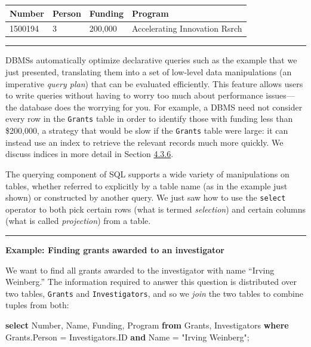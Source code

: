 \documentclass[]{krantz}
\newenvironment{Shaded}{\begin{snugshade}}{\end{snugshade}}
\newcommand{\KeywordTok}[1]{\textcolor[rgb]{0.13,0.29,0.53}{\textbf{#1}}}
\newcommand{\DataTypeTok}[1]{\textcolor[rgb]{0.13,0.29,0.53}{#1}}
\newcommand{\OtherTok}[1]{\textcolor[rgb]{0.56,0.35,0.01}{#1}}
\newcommand{\NormalTok}[1]{#1}
\begin{document}
\begin{longtable}[]{@{}llll@{}}
\toprule
\textbf{Number} & \textbf{Person} & \textbf{Funding} &
\textbf{Program}\tabularnewline
\midrule
\endhead
1500194 & 3 & 200,000 & Accelerating Innovation Rsrch\tabularnewline
\bottomrule
\end{longtable}

\begin{center}\rule{0.5\linewidth}{\linethickness}\end{center}

DBMSs automatically optimize declarative queries such as the example
that we just presented, translating them into a set of low-level data
manipulations (an imperative \emph{query plan}) that can be evaluated
efficiently. This feature allows users to write queries without having
to worry too much about performance issues---the database does the
worrying for you. For example, a DBMS need not consider every row in the
\texttt{Grants} table in order to identify those with funding less than
\$200,000, a strategy that would be slow if the \texttt{Grants} table
were large: it can instead use an index to retrieve the relevant records
much more quickly. We discuss indices in more detail in Section
\protect\hyperlink{sec:db:index}{4.3.6}.

The querying component of SQL supports a wide variety of manipulations
on tables, whether referred to explicitly by a table name (as in the
example just shown) or constructed by another query. We just saw how to
use the \texttt{select} operator to both pick certain rows (what is
termed \emph{selection}) and certain columns (what is called
\emph{projection}) from a table.

\begin{center}\rule{0.5\linewidth}{\linethickness}\end{center}

\textbf{Example: Finding grants awarded to an investigator}

We want to find all grants awarded to the investigator with name
``Irving Weinberg.'' The information required to answer this question is
distributed over two tables, \texttt{Grants} and \texttt{Investigators},
and so we \emph{join} the two tables to combine tuples from both:

\begin{Shaded}
\begin{Highlighting}[]
\KeywordTok{select} \DataTypeTok{Number}\NormalTok{, Name, Funding, Program}
\KeywordTok{from}\NormalTok{ Grants, Investigators}
\KeywordTok{where}\NormalTok{ Grants.Person = Investigators.ID}
\KeywordTok{and}\NormalTok{ Name = }\OtherTok{"Irving Weinberg"}\NormalTok{;}
\end{Highlighting}
\end{Shaded}
\end{document}

